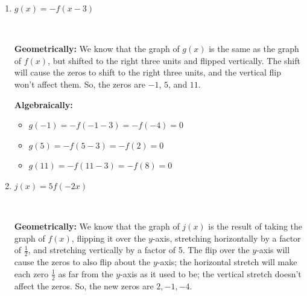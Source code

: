 \documentclass{article}
\begin{document}
\begin{enumerate}
\begin{enumerate}
    \textbf{Algebraically:} We can check that $-8, 4, 16$ really are zeros of $Q$ by plugging them into $Q$:
    \begin{itemize}
    \item $Q(-8) = f \left(\frac{-8}{2} \right) = f(-4)$, and we know that $f(-4)= 0$ because $-4$ is a zero of $f$.

    \item $Q(4) = f \left(\frac{4}{2} \right) = f(2)$, and we know that $f(2)= 0$ because 2 is a zero of $f$.

    \item $Q(16) = f \left(\frac{16}{2} \right) = f(8) = 0$, and we know that $f(8)= 0$ because 8 is a zero of $f$.
    \end{itemize}
    So, $Q(-8)$, $Q(4)$, and $Q(16)$ are all equal to 0. 

  \item
    \begin{problem}[\vfill]
      $g(x) = -f(x-3)$
    \end{problem}

    \begin{solution}\

      \textbf{Geometrically:} We know that the graph of $g(x)$ is the same as the graph of $f(x)$, but shifted to the right three units and flipped vertically. The shift will cause the zeros to shift to the right three units, and the vertical flip won't affect them. So, the zeros are $-1$, $5$, and $11$.

      \textbf{Algebraically:} 
      \begin{itemize}
      \item $g (-1 ) =  -f(-1-3) =-f(-4)=0$
      \item $g (5 ) = -f(5-3) = -f(2) =0$
      \item $g (11 ) = -f(11-3) =-f(8) =0$
      \end{itemize} 
    \end{solution} 

  \item
    \begin{problem}[\vfill\newpage]
      $j(x) = 5 f(-2x)$
    \end{problem}

    \begin{solution}\

      \textbf{Geometrically:} We know that the graph of $j(x)$ is the result of taking the graph of $f(x)$, flipping it over the $y$-axis, stretching horizontally by a factor of $\frac{1}{2}$, and stretching vertically by a factor of 5. The flip over the $y$-axis will cause the zeros to also flip about the $y$-axis; the horizontal stretch will make each zero $\frac{1}{2}$ as far from the $y$-axis as it used to be; the vertical stretch doesn't affect the zeros. So, the new zeros are $2, -1, -4$.


\end{solution}
\end{enumerate}
\end{enumerate}
\end{document}

